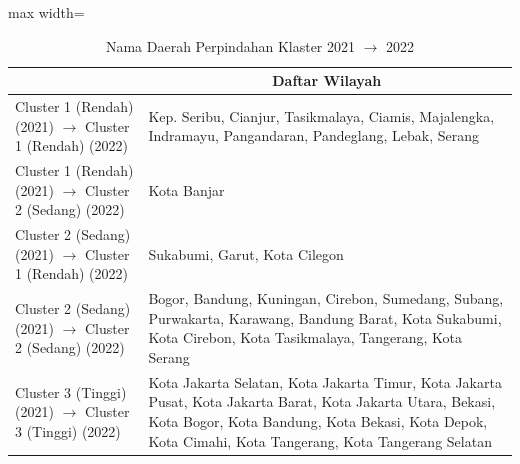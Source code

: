 \begin{table}[H]
\centering
\caption{Nama Daerah Perpindahan Klaster 2021 \(\rightarrow\) 2022} \label{tab:app2transname2021x2022}
\begin{adjustbox}{max width=\textwidth}
\begin{tabular}{|>{\centering\arraybackslash}p{4cm}|p{10cm}|}
\hline
\multicolumn{1}{|c|}{\textbf{Kategori}} & \multicolumn{1}{c|}{\textbf{Daftar Wilayah}} \\
\hline
Cluster 1 (Rendah) (2021) \(\rightarrow\) Cluster 1 (Rendah) (2022) & Kep. Seribu, Cianjur, Tasikmalaya, Ciamis, Majalengka, Indramayu, Pangandaran, Pandeglang, Lebak, Serang \\
\hline
Cluster 1 (Rendah) (2021) \(\rightarrow\) Cluster 2 (Sedang) (2022) & Kota Banjar \\
\hline
Cluster 2 (Sedang) (2021) \(\rightarrow\) Cluster 1 (Rendah) (2022) & Sukabumi, Garut, Kota Cilegon \\
\hline
Cluster 2 (Sedang) (2021) \(\rightarrow\) Cluster 2 (Sedang) (2022) & Bogor, Bandung, Kuningan, Cirebon, Sumedang, Subang, Purwakarta, Karawang, Bandung Barat, Kota Sukabumi, Kota Cirebon, Kota Tasikmalaya, Tangerang, Kota Serang \\
\hline
Cluster 3 (Tinggi) (2021) \(\rightarrow\) Cluster 3 (Tinggi) (2022) & Kota Jakarta Selatan, Kota Jakarta Timur, Kota Jakarta Pusat, Kota Jakarta Barat, Kota Jakarta Utara, Bekasi, Kota Bogor, Kota Bandung, Kota Bekasi, Kota Depok, Kota Cimahi, Kota Tangerang, Kota Tangerang Selatan \\
\hline
\end{tabular}
\end{adjustbox}
\end{table}